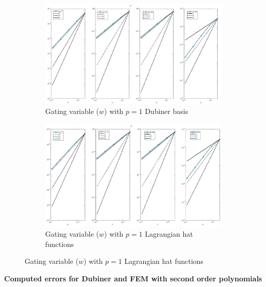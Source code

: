 \documentclass[a4paper,11pt]{article}
\begin{document}
\begin{figure}[H]
\caption{Comparison of the gating variable ($w$)}
\label{w_1}
\begin{subfigure}{\textwidth}
\begin{center}
\includegraphics[width = \textwidth]{./D1_w_1.jpg}
\caption{Gating variable ($w$) with $p=1$ Dubiner basis}
\end{center}
\end{subfigure}
\begin{subfigure}{\textwidth}
\begin{center}
\includegraphics[width =\textwidth]{./P1_w_1.jpg}
\caption{Gating variable ($w$) with $p=1$ Lagrangian hat functions}
\end{center}
\end{subfigure}
\end{figure}
\newpage
\begin{center}
\textbf{Computed errors for Dubiner and FEM with second order polynomials}
\end{center}
\end{document}
